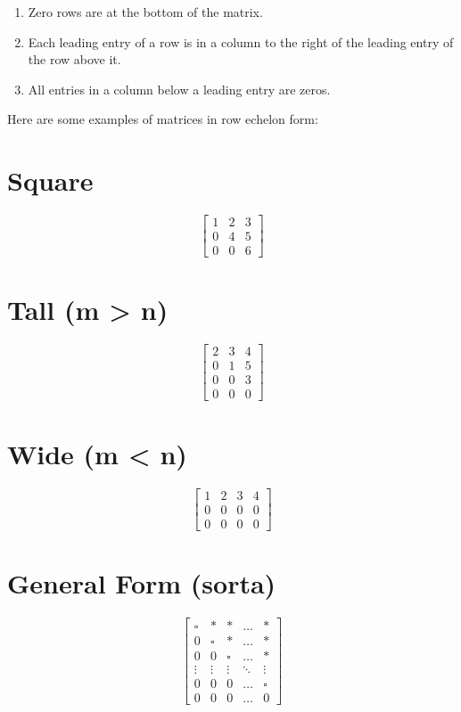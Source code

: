 \documentclass[
  letterpaper,
  DIV=11,
  numbers=noendperiod]{scrreprt}
\providecommand{\tightlist}{%
  \setlength{\itemsep}{0pt}\setlength{\parskip}{0pt}}\usepackage{longtable,booktabs,array}
\begin{document}
\begin{enumerate}
\def\labelenumi{\arabic{enumi}.}
\tightlist
\item
  Zero rows are at the bottom of the matrix.
\item
  Each leading entry of a row is in a column to the right of the leading
  entry of the row above it.
\item
  All entries in a column below a leading entry are zeros.
\end{enumerate}

Here are some examples of matrices in row echelon form:

\chapter{Square}

\[
\begin{bmatrix}
    1 & 2 & 3 \\
    0 & 4 & 5 \\
    0 & 0 & 6 
\end{bmatrix}
\]

\chapter{Tall (m \textgreater{} n)}

\[
\begin{bmatrix}
    2 & 3 & 4 \\
    0 & 1 & 5 \\
    0 & 0 & 3 \\
    0 & 0 & 0
\end{bmatrix}
\]

\chapter{Wide (m \textless{} n)}

\[
\begin{bmatrix}
  1 & 2 & 3 & 4 \\
  0 & 0 & 0 & 0 \\
  0 & 0 & 0 & 0
\end{bmatrix}
\]

\chapter{General Form (sorta)}

\[
\begin{bmatrix}
    \square & * & * & \dots & * \\
    0 & \square & * & \dots & * \\
    0 & 0 & \square & \dots & * \\
    \vdots & \vdots & \vdots & \ddots & \vdots \\
    0 & 0 & 0 & \dots & \square \\
    0 & 0 & 0 & \dots & 0
\end{bmatrix}
\]
\end{document}
